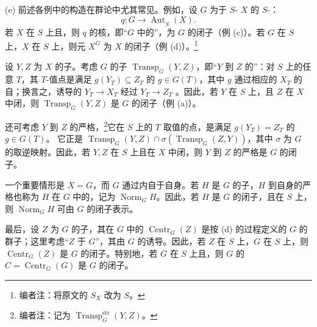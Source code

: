 (e) 前述各例中的构造在群论中尤其常见。例如，设 $G$ 为于 $S$- $X$ 的 $S$-：
\[
q:G\longrightarrow\underline{\operatorname{Aut}}_S(X).
\]
若 $X$ 在 $S$ 上且，则 $q$ 的核，即“$G$ 中的”，为 $G$ 的闭子（例 (c)）。若 $G$ 在 $S$ 上，$X$ 在 $S$ 上，则元 $X^G$ 为 $X$ 的闭子（例 (d)）。\footnote[27]{编者注：将原文的 $S_X$ 改为 $S$。}

设 $Y,Z$ 为 $X$ 的子。考虑 $G$ 的子 $\operatorname{Transp}_G(Y,Z)$，即“$Y$ 到 $Z$ 的”：对 $S$ 上的任意 $T$，其 $T$-值点是满足 $g(Y_T)\subseteq Z_T$ 的 $g\in G(T)$，其中 $g$ 通过相应的 $X_T$ 的自；换言之，诱导的 $Y_T\to X_T$ 经过 $Y_T\to Z_T$ 。因此，若 $Y$ 在 $S$ 上，且 $Z$ 在 $X$ 中闭，则 $\operatorname{Transp}_G(Y,Z)$ 是 $G$ 的闭子（例 (a)）。

还可考虑 $Y$ 到 $Z$ 的严格，\footnote[28]{编者注：记为 $\operatorname{Transp}^{\mathrm{str}}_G(Y,Z)$。}它在 $S$ 上的 $T$ 取值的点，是满足 $g(Y_T)=Z_T$ 的 $g\in G(T)$。
它正是 $\operatorname{Transp}_G(Y,Z)\cap\sigma(\operatorname{Transp}_G(Z,Y))$，其中 $\sigma$ 为 $G$ 的取逆映射。因此，若 $Y,Z$ 在 $S$ 上且在 $X$ 中闭，则 $Y$ 到 $Z$ 的严格是 $G$ 的闭子。

一个重要情形是 $X=G$，而 $G$ 通过内自于自身。若 $H$ 是 $G$ 的子，$H$ 到自身的严格也称为 $H$ 在 $G$ 中的，记为 $\operatorname{Norm}_GH$。因此，若 $H$ 是 $G$ 的闭子，且在 $S$ 上，则 $\operatorname{Norm}_GH$ 可由 $G$ 的闭子表示。

最后，设 $Z$ 为 $G$ 的子，其在 $G$ 中的 $\operatorname{Centr}_G(Z)$ 是按 (d) 的过程定义的 $G$ 的群子；这里考虑“$Z$ 于 $G$”，其由 $G$ 的诱导。因此，若 $Z$ 在 $S$ 上，$G$ 在 $S$ 上，则 $\operatorname{Centr}_G(Z)$ 是 $G$ 的闭子。特别地，若 $G$ 在 $S$ 上且，则 $G$ 的 $C=\operatorname{Centr}_G(G)$ 是 $G$ 的闭子。

